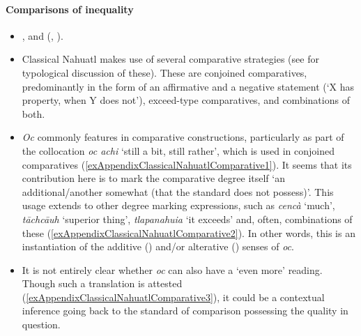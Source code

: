 \paragraph{Comparisons of inequality}\label{appendixClassicalNahuatlComparisons}
\begin{itemize}
	\item \textcite[563–565]{Andrews2003}, \textcite[490–492]{Carochi1645} and \citeauthor{Launey1986} (\citeyear[1267]{Launey1986}, \citeyear[340]{LauneyMackay2011}).
	\item Classical Nahuatl makes use of several comparative strategies (see \cite{Stassen2013} for typological discussion of these). These are conjoined comparatives, predominantly in the form of an affirmative and a negative statement (\lq X has property, when Y does not\rq{}), exceed-type comparatives, and combinations of both.
	\item  \textit{Oc} commonly features in comparative constructions, particularly as part of the collocation \textit{oc achi} \lq still a bit, still rather\rq{}, which is used in conjoined comparatives (\ref{exAppendixClassicalNahuatlComparative1}). It seems that its contribution here is to mark the comparative degree itself \lq an additional/another somewhat (that the standard does not possess)\rq{}. This usage extends to other degree marking expressions, such as \textit{cencà} \lq much\rq{}, \textit{tāchcāuh} \lq superior thing\rq{},  \textit{tlapanahuia} \lq it exceeds\rq{} and, often, combinations of these (\ref{exAppendixClassicalNahuatlComparative2}).
In other words, this is an instantiation of the additive () and/or alterative () senses of \textit{oc}.
	
		\item It is not entirely clear whether \textit{oc} can also have a \lq even more\rq{ }reading. Though such a translation is attested (\ref{exAppendixClassicalNahuatlComparative3}), it could be a contextual inference going back to the standard of comparison possessing the quality in question.
\end{itemize}
